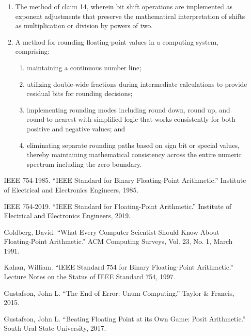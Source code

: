 \documentclass[12pt,letter]{article}
\begin{document}
\begin{enumerate}
    \item The method of claim 14, wherein bit shift operations are implemented as exponent adjustments that preserve the mathematical interpretation of shifts as multiplication or division by powers of two.
\newpage
    \item A method for rounding floating-point values in a computing system, comprising:
        \begin{enumerate}
            \item maintaining a continuous number line;
            \item utilizing double-wide fractions during intermediate calculations to provide residual bits for rounding decisions;
            \item implementing rounding modes including round down, round up, and round to nearest with simplified logic that works consistently for both positive and negative values; and
            \item eliminating separate rounding paths based on sign bit or special values, thereby maintaining mathematical consistency across the entire numeric spectrum including the zero boundary.
        \end{enumerate}
\end{enumerate}

\begin{thebibliography}{}

 IEEE 754-1985. ``IEEE Standard for Binary Floating-Point Arithmetic.'' Institute of Electrical and Electronics Engineers, 1985.

 IEEE 754-2019. ``IEEE Standard for Floating-Point Arithmetic.'' Institute of Electrical and Electronics Engineers, 2019.

 Goldberg, David. ``What Every Computer Scientist Should Know About Floating-Point Arithmetic.'' ACM Computing Surveys, Vol. 23, No. 1, March 1991.

 Kahan, William. ``IEEE Standard 754 for Binary Floating-Point Arithmetic.'' Lecture Notes on the Status of IEEE Standard 754, 1997.

 Gustafson, John L. ``The End of Error: Unum Computing.'' Taylor \& Francis, 2015.

 Gustafson, John L. ``Beating Floating Point at its Own Game: Posit Arithmetic.'' South Ural State University, 2017.

\end{thebibliography}
\end{document}
